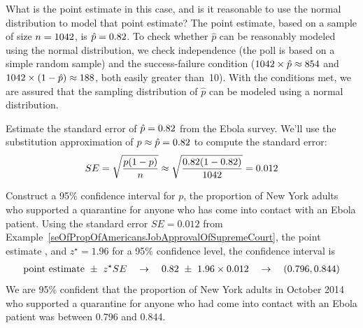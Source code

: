 \begin{examplewrap}
\begin{nexample}{What is the point estimate in this case,
    and is it reasonable to
    use the normal distribution to model that point estimate?}
  The point estimate, based on a sample of size $n = 1042{}$,
  is $\hat{p} = 0.82{}$. To check whether $\hat{p}$ can be reasonably
  modeled using the normal distribution, we check independence
  (the poll is based on a simple random sample) and the
  success-failure condition
  ($1042{} \times \hat{p} \approx 854{}$
  and $1042{} \times (1 - \hat{p})
      \approx 188{}$,
  both easily greater than~10). With the conditions met, we are assured
  that the sampling distribution of $\hat{p}$ can be modeled using
  a normal distribution.
\end{nexample}
\end{examplewrap}

\begin{examplewrap}
\begin{nexample}{Estimate the standard error of
    $\hat{p} = 0.82{}$ from the Ebola survey.}
  We'll use the substitution approximation of
  $p \approx \hat{p} = 0.82{}$ to compute the standard error:
  \begin{align*}
  SE = \sqrt{\frac{p(1-p)}{n}}
    \approx \sqrt{\frac{0.82{}
        (1 - 0.82{})}{1042{}}}
    = 0.012{}
  \end{align*}
\end{nexample}
\end{examplewrap}

\begin{examplewrap}
\begin{nexample}{Construct a 95\% confidence interval for $p$,
    the proportion of New York adults who supported a quarantine
    for anyone who has come into contact with an Ebola patient.}
  Using the standard error $SE = 0.012$ from
  Example~\ref{seOfPropOfAmericansJobApprovalOfSupremeCourt},
  the point estimate \wsjebolapollprop{}, and $z^{\star} = 1.96$
  for a 95\% confidence level, the confidence interval is
  \begin{eqnarray*}
  \text{point estimate} \ \pm\ z^{\star}SE
    \quad\to\quad 0.82{} \ \pm\ 1.96\times 0.012{}
    \quad\to\quad (0.796, 0.844)
  \end{eqnarray*}
  We are 95\% confident that the proportion of New York adults
  in October 2014 who supported a quarantine for anyone who had come
  into contact with an Ebola patient was between 0.796 and 0.844.
\end{nexample}
\end{examplewrap}

